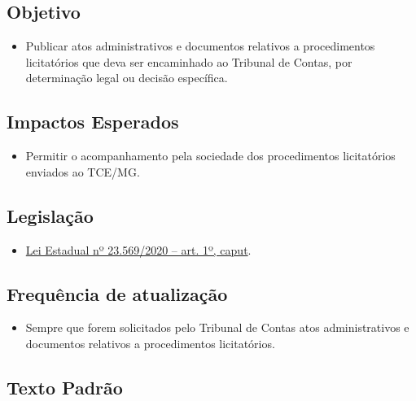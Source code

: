 \documentclass[
]{book}
\providecommand{\tightlist}{%
  \setlength{\itemsep}{0pt}\setlength{\parskip}{0pt}}
\begin{document}
\hypertarget{objetivo-10}{%
\subsection{Objetivo}\label{objetivo-10}}

\begin{itemize}
\tightlist
\item
  Publicar atos administrativos e documentos relativos a procedimentos licitatórios que deva ser encaminhado ao Tribunal de Contas, por determinação legal ou decisão específica.
\end{itemize}

\hypertarget{impactos-esperados-11}{%
\subsection{Impactos Esperados}\label{impactos-esperados-11}}

\begin{itemize}
\tightlist
\item
  Permitir o acompanhamento pela sociedade dos procedimentos licitatórios enviados ao TCE/MG.
\end{itemize}

\hypertarget{legislauxe7uxe3o-11}{%
\subsection{Legislação}\label{legislauxe7uxe3o-11}}

\begin{itemize}
\tightlist
\item
  \href{https://www.almg.gov.br/consulte/legislacao/completa/completa.html?tipo=LEI\&num=23569\&comp=\&ano=2020}{Lei Estadual nº 23.569/2020 -- art. 1º, caput}.
\end{itemize}

\hypertarget{frequuxeancia-de-atualizauxe7uxe3o-10}{%
\subsection{Frequência de atualização}\label{frequuxeancia-de-atualizauxe7uxe3o-10}}

\begin{itemize}
\tightlist
\item
  Sempre que forem solicitados pelo Tribunal de Contas atos administrativos e documentos relativos a procedimentos licitatórios.
\end{itemize}

\hypertarget{texto-padruxe3o-11}{%
\subsection{Texto Padrão}\label{texto-padruxe3o-11}}
\end{document}
